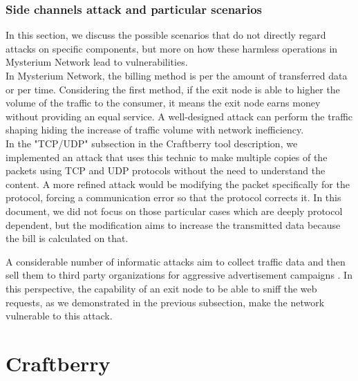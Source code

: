 \documentclass[12pt]{article}
\begin{document}
	\subsubsection{Side channels attack and particular scenarios}
	In this section, we discuss the possible scenarios that do not directly regard attacks on specific components, but more on how these harmless operations in Mysterium Network lead to vulnerabilities.\\
	In Mysterium Network, the billing method is per the amount of transferred data or per time. Considering the first method, if the exit node is able to higher the volume of the traffic to the consumer, it means the exit node earns money without providing an equal service. A well-designed attack can perform the traffic shaping hiding the increase of traffic volume with network inefficiency.\\
	In the "TCP/UDP" subsection in the Craftberry tool description, we implemented an attack that uses this technic to make multiple copies of the packets using TCP and UDP protocols without the need to understand the content. A more refined attack would be modifying the packet specifically for the protocol, forcing a communication error so that the protocol corrects it. In this document, we did not focus on those particular cases which are deeply protocol dependent, but the modification aims to increase the transmitted data because the bill is calculated on that.\\
	\bigbreak

	A considerable number of informatic attacks aim to collect traffic data and then sell them to third party organizations for aggressive advertisement campaigns \cite{VPNsellData}. In this perspective, the capability of an exit node to be able to sniff the web requests, as we demonstrated in the previous subsection, make the network vulnerable to this attack.\\



	\newpage
	\section{Craftberry}
\end{document}
